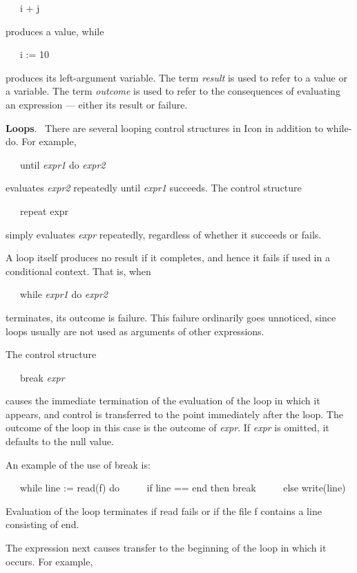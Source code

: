 {\ttfamily\mdseries
\ \ \ i + j}

\noindent produces a value, while

{\ttfamily\mdseries
\ \ \ i := 10}

\noindent produces its left-argument variable. The term
\textit{result} is used to refer to a value or a variable. The term
\textit{outcome }is used to refer to the consequences of evaluating an
expression --- either its result or failure.

\textbf{Loops}. \ There are several looping control structures in Icon in addition to while-do. For example,

{\ttfamily\mdseries
\ \ \ until \textit{expr1 }do \textit{expr2}}

\noindent evaluates \textit{expr2} repeatedly until \textit{expr1}
succeeds. The control structure

{\ttfamily\mdseries
\ \ \ repeat expr}

\noindent simply evaluates \textit{expr} repeatedly, regardless of
whether it succeeds or fails.

A loop itself produces no result if it completes, and hence it fails
if used in a conditional context. That is, when

{\ttfamily\mdseries
\ \ \ while \textit{expr1 }do \textit{expr2}}

\noindent terminates, its outcome is failure. This failure ordinarily
goes unnoticed, since loops usually are not used as arguments of other
expressions.

The control structure

{\ttfamily\mdseries
\ \ \ break \textit{expr}}

\noindent causes the immediate termination of the evaluation of the
loop in which it appears, and control is transferred to the point
immediately after the loop. The outcome of the loop in this case is
the outcome of \textit{expr}. If \textit{expr} is omitted, it defaults
to the null value.

An example of the use of break is:

{\ttfamily\mdseries
\ \ \ while line := read(f) do\newline
 \ \ \ \ \ if line == {\textquotedbl}end{\textquotedbl} then break\newline
 \ \ \ \ \ else write(line)}

Evaluation of the loop terminates if read fails or if the file f
contains a line consisting of {\textquotedbl}end{\textquotedbl}.

The expression next causes transfer to the beginning of the loop in
which it occurs. For example,

